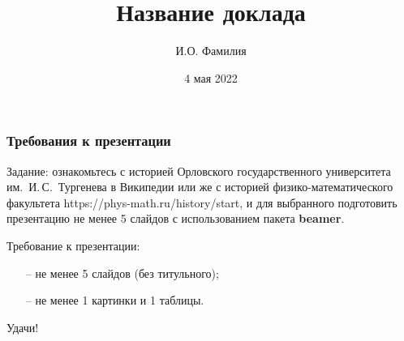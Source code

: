 \documentclass[pdf,hyperref={unicode}, aspectratio=43, serif,11pt]{beamer}
\title[Короткое название мероприятия]{Название доклада}
\author{И.О. Фамилия}
\date{4 мая 2022}
\institute[]{Орловский государственный
университет имени И.\,С.~Тургенева}
\begin{document}
\begin{frame}
\titlepage
\end{frame}

\begin{frame}
\frametitle{Требования к презентации}
Задание: ознакомьтесь с историей Орловского государственного университета им.~{И.\,С.}~Тургенева в Википедии или же с историей физико-математического факультета https://phys-math.ru/history/start, и для выбранного подготовить презентацию не менее 5 слайдов с использованием пакета {\bf beamer}.

Требование к презентации:
\begin{itemize}
\item[--] не менее 5 слайдов (без титульного);
\item[--] не менее 1 картинки и 1 таблицы. 
\end{itemize}

Удачи!
\end{frame}
\end{document}
